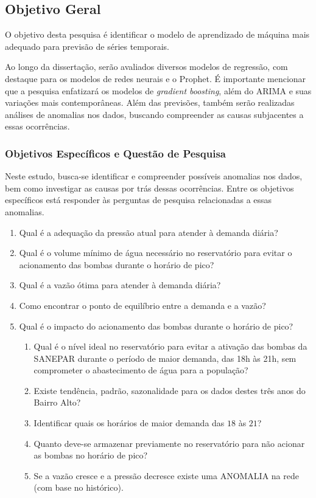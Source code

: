 \subsection{Objetivo Geral} \label{subsec:objetivos}

O objetivo desta pesquisa é identificar o modelo de aprendizado de máquina mais adequado para previsão de séries temporais. 

Ao longo da dissertação, serão avaliados diversos modelos de regressão, com destaque para os modelos de redes neurais e o Prophet. É importante mencionar que a pesquisa enfatizará os modelos de \textit{gradient boosting}, além do ARIMA e suas variações mais contemporâneas. Além das previsões, também serão realizadas análises de anomalias nos dados, buscando compreender as causas subjacentes a essas ocorrências.
 
    
    
    \subsubsection{Objetivos Espec\'ificos e Quest\~ao de Pesquisa} \label{subsubsec:obespec}
    
Neste estudo, busca-se identificar e compreender possíveis anomalias nos dados, bem como investigar as causas por trás dessas ocorrências. Entre os objetivos específicos está responder às perguntas de pesquisa relacionadas a essas anomalias.

\begin{enumerate}[start=1, label={\textbf{Q} \arabic*}]
	\item \label{q1} Qual é a adequação da pressão atual para atender à demanda diária?
	\item \label{q2} Qual é o volume mínimo de água necessário no reservatório para evitar o acionamento das bombas durante o horário de pico? 
	\item \label{q3} Qual é a vazão ótima para atender à demanda diária?
	\item \label{q4} Como encontrar o ponto de equilíbrio entre a demanda e a vazão?
	\item \label{q5} Qual é o impacto do acionamento das bombas durante o horário de pico?
	 
	\begin{enumerate}[label=\alph*.]
	\item \label{q5:a} Qual é o nível ideal no reservatório para evitar a ativação das bombas da SANEPAR durante o período de maior demanda, das 18h às 21h, sem comprometer o abastecimento de água para a população?  
	\item \label{q5:b} Existe tendência, padrão, sazonalidade para os dados destes três anos do Bairro Alto?
	\item \label{q5:c} Identificar quais os horários de maior demanda das $18$ às $21$?
	\item \label{q5:d} Quanto deve-se armazenar previamente no reservatório para não acionar as bombas no horário de pico?
	\item \label{q5:e} Se a vazão cresce e a pressão decresce existe uma ANOMALIA na rede (com base no histórico).	
	\end{enumerate}
\end{enumerate}
